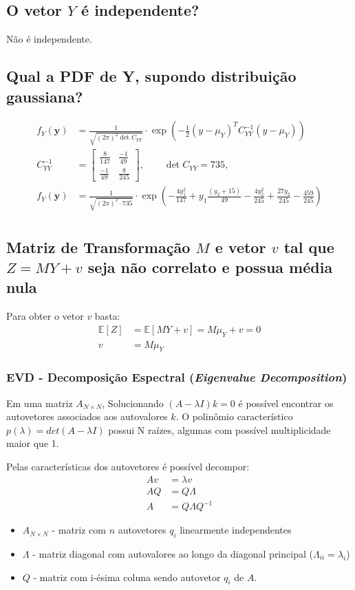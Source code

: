 \documentclass{article}
\begin{document}
\subsection{O vetor $Y$ é independente?}
Não é independente.

\subsection{Qual a PDF de Y, supondo distribuição gaussiana?}
\begin{align*}
    f_Y(\mathbf{y}) &= \frac{1}{\sqrt{(2\pi)^2 \det{C_{YY}}}} \cdot \exp{\left(-\frac{1}{2}(y-\mu_Y)^T C_{YY}^{-1} (y-\mu_Y)\right)} \\
    C_{YY}^{-1} &= \begin{bmatrix} \frac{8}{147} & \frac{-1}{49}\\\frac{-1}{49} & \frac{8}{245} \end{bmatrix}, \qquad \det{C_{YY}} = 735, \\
    f_Y(\mathbf{y}) &= \frac{1}{\sqrt{(2\pi)^2 \cdot 735}} \cdot \exp{\left(-\frac{4y_1^2}{147} + y_1\frac{(y_2+15)}{49} -\frac{4y_2^2}{245} + \frac{27y_2}{245} -\frac{459}{245}\right)}\\
\end{align*}

\subsection{Matriz de Transformação $M$ e  vetor $v$ tal que $Z = MY + v$ seja não correlato e
possua média nula}

Para obter o vetor $v$ basta:
\begin{align*}
    \mathbb{E}[Z] &= \mathbb{E}[MY + v] = M\mu_Y + v = 0 \\
    v &= M\mu_Y
\end{align*}

\subsubsection{EVD - Decomposição Espectral (\textit{Eigenvalue Decomposition})}
Em uma matriz $A_{N \times N}$, Solucionando $(A -\lambda I)k = 0$ é possível encontrar os
autovetores associados aos autovalores $k$. O polinômio característico $p(\lambda) = det(A - \lambda
I)$ possui N raízes, algumas com possível multiplicidade maior que 1.

Pelas características dos autovetores é possível decompor:
\begin{align*}
    Av &= \lambda v \\
    A Q &= Q \Lambda \\
    A &= Q \Lambda Q^{-1}
\end{align*}
\begin{itemize}
    \item $A_{N \times N}$ - matriz com $n$ autovetores $q_i$ linearmente independentes
    \item $\Lambda$ - matriz diagonal com autovalores ao longo da diagonal principal ($\Lambda_{ii} = \lambda_i$)
    \item $Q$ - matriz com i-ésima coluna sendo autovetor $q_i$ de $A$.
\end{itemize}
\end{document}
